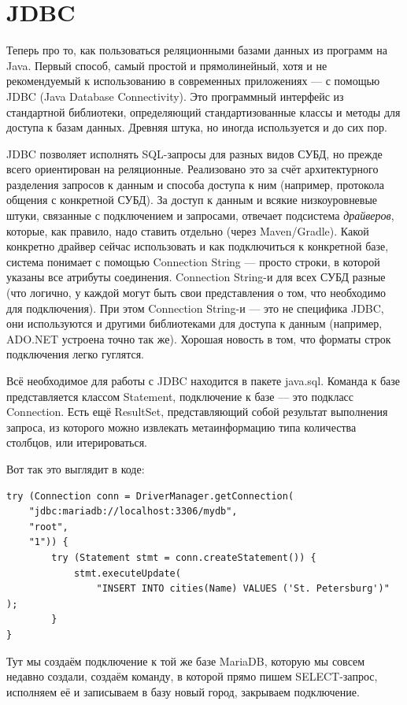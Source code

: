 \documentclass[a5paper]{article}
\begin{document}
\section{JDBC}

Теперь про то, как пользоваться реляционными базами данных из программ на Java. Первый способ, самый простой и прямолинейный, хотя и не рекомендуемый к использованию в современных приложениях --- с помощью JDBC (Java Database Connectivity). Это программный интерфейс из стандартной библиотеки, определяющий стандартизованные классы и методы для доступа к базам данных. Древняя штука, но иногда используется и до сих пор.

JDBC позволяет исполнять SQL-запросы для разных видов СУБД, но прежде всего ориентирован на реляционные. Реализовано это за счёт архитектурного разделения запросов к данным и способа доступа к ним (например, протокола общения с конкретной СУБД). За доступ к данным и всякие низкоуровневые штуки, связанные с подключением и запросами, отвечает подсистема \textit{драйверов}, которые, как правило, надо ставить отдельно (через Maven/Gradle). Какой конкретно драйвер сейчас использовать и как подключиться к конкретной базе, система понимает с помощью Connection String --- просто строки, в которой указаны все атрибуты соединения. Connection String-и для всех СУБД разные (что логично, у каждой могут быть свои представления о том, что необходимо для подключения). При этом Connection String-и --- это не специфика JDBC, они используются и другими библиотеками для доступа к данным (например, ADO.NET устроена точно так же). Хорошая новость в том, что форматы строк подключения легко гуглятся.

Всё необходимое для работы с JDBC находится в пакете java.sql. Команда к базе представляется классом Statement, подключение к базе --- это подкласс Connection. Есть ещё ResultSet, представляющий собой результат выполнения запроса, из которого можно извлекать метаинформацию типа количества столбцов, или итерироваться.

Вот так это выглядит в коде:

\begin{verbatim}
try (Connection conn = DriverManager.getConnection(
    "jdbc:mariadb://localhost:3306/mydb",
    "root",
    "1")) {
        try (Statement stmt = conn.createStatement()) {
            stmt.executeUpdate(
                "INSERT INTO cities(Name) VALUES ('St. Petersburg')" );
        }
}
\end{verbatim}

Тут мы создаём подключение к той же базе MariaDB, которую мы совсем недавно создали, создаём команду, в которой прямо пишем SELECT-запрос, исполняем её и записываем в базу новый город, закрываем подключение. 
\end{document}
